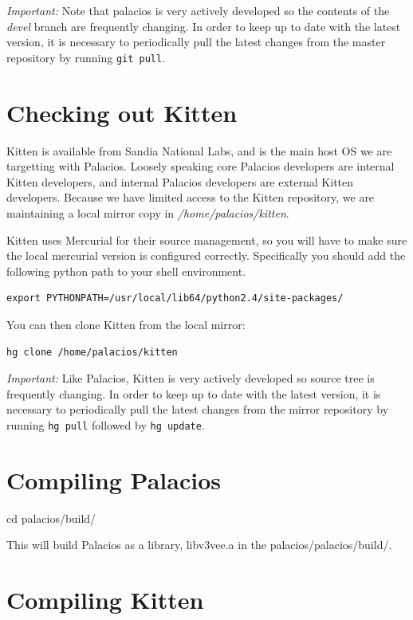 \documentclass[11pt]{article}
\begin{document}
{\em Important:}
Note that palacios is very actively developed so the contents of the
{\em devel} branch are frequently changing. In order to keep up to
date with the latest version, it is necessary to periodically pull the
latest changes from the master repository by running \verb.git pull..



\section{Checking out Kitten}

Kitten is available from Sandia National Labs, and is the main host OS
we are targetting with Palacios. Loosely speaking core Palacios
developers are internal Kitten developers, and internal Palacios
developers are external Kitten developers. Because we have limited
access to the Kitten repository, we are maintaining a local mirror
copy in {\em /home/palacios/kitten}. 

Kitten uses Mercurial for their source management, so you will have to
make sure the local mercurial version is configured correctly.
Specifically you should add the following python path to your shell environment.

\begin{verbatim}
export PYTHONPATH=/usr/local/lib64/python2.4/site-packages/
\end{verbatim}

You can then clone Kitten from the local mirror:
\begin{verbatim}
hg clone /home/palacios/kitten
\end{verbatim}


{\em Important:} Like Palacios, Kitten is very actively developed so
source tree is frequently changing. In order to keep up to date with
the latest version, it is necessary to periodically pull the latest
changes from the mirror repository by running \verb.hg pull. followed
by \verb.hg update..

\section{Compiling Palacios}
cd palacios/build/


This will build Palacios as a library, libv3vee.a in the palacios/palacios/build/.


\section{Compiling Kitten}
\end{document}
